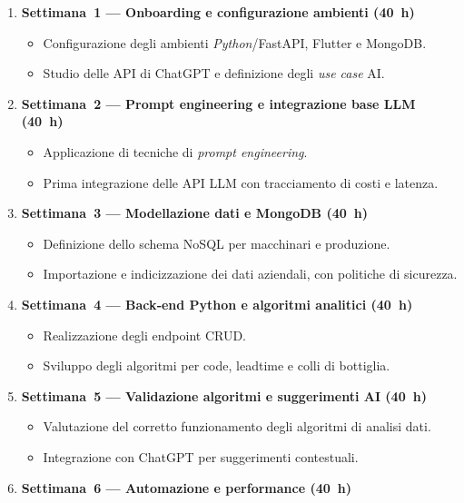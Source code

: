 \begin{enumerate}
    \item \textbf{Settimana~1 — Onboarding e configurazione ambienti (40~h)}
        \begin{itemize}
            \item Configurazione degli ambienti \textit{Python}/FastAPI, Flutter e MongoDB.
            \item Studio delle \gls{API} di ChatGPT e definizione degli \textit{use case} AI.
        \end{itemize}
    \item \textbf{Settimana~2 — Prompt engineering e integrazione base LLM (40~h)}
        \begin{itemize}
            \item Applicazione di tecniche di \textit{prompt engineering}.
            \item Prima integrazione delle \gls{API} LLM con tracciamento di costi e latenza.
        \end{itemize}
    \item \textbf{Settimana~3 — Modellazione dati e MongoDB (40~h)}
        \begin{itemize}
            \item Definizione dello schema NoSQL per macchinari e produzione.
            \item Importazione e indicizzazione dei dati aziendali, con politiche di sicurezza.
        \end{itemize}
    \item \textbf{Settimana~4 — Back‑end Python e algoritmi analitici (40~h)}
        \begin{itemize}
            \item Realizzazione degli endpoint CRUD.
            \item Sviluppo degli algoritmi per code, \gls{leadtime} e colli di bottiglia.
        \end{itemize}
    \item \textbf{Settimana~5 — Validazione algoritmi e suggerimenti AI (40~h)}
        \begin{itemize}
            \item Valutazione del corretto funzionamento degli algoritmi di analisi dati.
            \item Integrazione con ChatGPT per suggerimenti contestuali.
        \end{itemize}
    \item \textbf{Settimana~6 — Automazione e performance (40~h)}

\end{enumerate}
